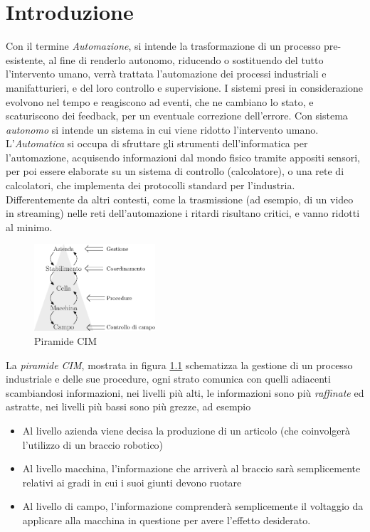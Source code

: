 \documentclass[10pt, letterpaper]{report}
\begin{document}
\chapter{Introduzione}
Con il termine \textit{Automazione}, si intende la trasformazione 
di un processo pre-esistente, al fine di renderlo autonomo, riducendo o 
sostituendo del tutto l'intervento umano, verrà trattata l'automazione 
dei processi industriali e manifatturieri, e del loro controllo e 
supervisione. I sistemi presi in considerazione evolvono nel 
tempo e reagiscono ad eventi, che ne cambiano lo stato, e scaturiscono 
dei feedback, per un eventuale correzione dell'errore.\acc 
Con sistema \textit{autonomo} si intende un sistema in cui viene 
ridotto l'intervento umano. L'\textit{Automatica} si occupa di 
sfruttare gli strumenti dell'informatica per l'automazione, acquisendo informazioni 
dal mondo fisico tramite appositi sensori, per poi essere elaborate 
su un sistema di controllo (calcolatore), o una rete di calcolatori, 
che implementa dei protocolli standard per l'industria. Differentemente da 
altri contesti, come la trasmissione (ad esempio, di un video in streaming) nelle 
reti dell'automazione i ritardi risultano critici, e vanno ridotti al 
minimo.
\begin{center}
    \begin{figure}[h!]
        \centering
        \includegraphics[width=0.4\textwidth ]{images/CIM.eps}
        \caption{Piramide CIM}
        \label{fig:cim}
   \end{figure}
   \end{center}
La \textit{piramide CIM}, mostrata in figura \ref{fig:cim}
schematizza la gestione di un processo industriale e delle sue procedure, 
ogni strato comunica con quelli adiacenti scambiandosi informazioni, nei 
livelli più alti, le informazioni sono più \textit{raffinate} ed 
astratte, nei livelli più bassi sono più grezze, ad esempio\begin{itemize}
    \item Al livello azienda viene decisa la produzione di un articolo (che 
    coinvolgerà l'utilizzo di un braccio robotico)
    \item Al livello macchina, l'informazione che arriverà al braccio 
    sarà semplicemente relativi ai gradi in cui i suoi giunti devono 
    ruotare
    \item Al livello di campo, l'informazione comprenderà semplicemente 
    il voltaggio da applicare alla macchina in questione per avere l'effetto 
    desiderato.
\end{itemize}
\end{document}
